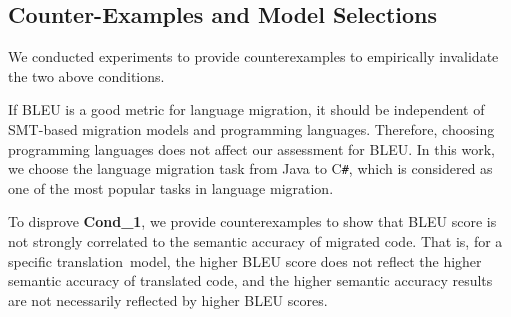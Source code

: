 \subsection{Counter-Examples and Model Selections}

 

We conducted experiments to provide counterexamples to empirically
invalidate the two above conditions. 

If BLEU is a good metric for language migration, it should be
independent of SMT-based migration models and programming
languages. Therefore, choosing programming languages does not affect
our assessment for BLEU. In this work, we choose the language
migration task from Java to C\texttt{\#}, which is considered as one
of the most popular tasks in language migration.

%
%

To disprove {\bf Cond\_1}, we provide counterexamples to show that
BLEU score is not strongly correlated to the semantic accuracy of
migrated code. That is, for a specific translation~model, the higher
BLEU score does not reflect the higher semantic accuracy of translated
code, and the higher semantic accuracy results are not necessarily
reflected by higher BLEU scores.
%
%
%

